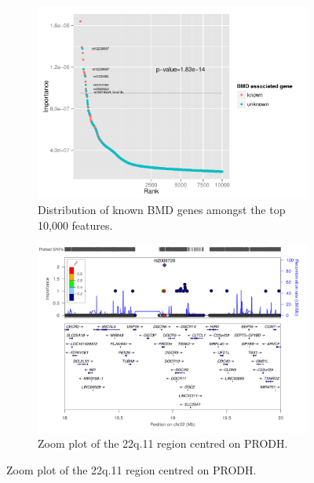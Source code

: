 \documentclass[10pt,letterpaper]{article}
\begin{document}
\begin{figure}[tbhp]
  \begin{adjustwidth}{-2.00in}{0in}
    \caption{\textbf{Importance of 10,000 top ranked features and visualisation of the 22q.11 region}}
    \label{figure:ranksumtest}
     \begin{subfigure}[b]{0.5\linewidth}
    \includegraphics[totalheight=7cm]{./figs/BMDTop10K.pdf}
     \caption{Distribution of known BMD genes amongst the top 10,000 features.} 
      \label{figure:rbo-prod.png} 
    \end{subfigure} 
 \begin{subfigure}[b]{0.5\linewidth}
      \centering
      \includegraphics[totalheight=7cm]{./figs/EURchr22_18-20mb.pdf}
      \caption{Zoom plot of the 22q.11 region centred on PRODH.} 

\end{subfigure}
\end{adjustwidth}
\end{figure}
\end{document}
